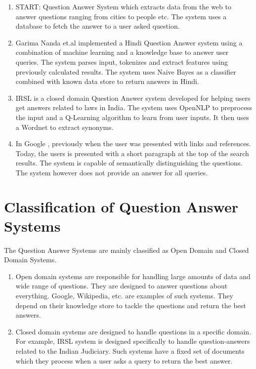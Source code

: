 \begin{enumerate}
\item 
START: Question Answer System \cite{katz1997annotating} which extracts data from the web to answer questions ranging from cities to people etc. The system uses a database to fetch the answer to a user asked question.

\item
Garima Nanda et.al implemented a Hindi Question Answer system \cite {nanda2016hindi} using a combination of machine learning and a knowledge base to answer user queries. The system parses input, tokenizes and extract features using previously calculated results. The system uses  Naive Bayes as a classifier combined with known data store to return answers in Hindi.

\item
IRSL \cite {sangeetha2017information} is a closed domain Question Answer system developed for helping users get answers related to laws in India. The system uses OpenNLP to preprocess the input and a Q-Learning algorithm to learn from user inputs. It then uses a Wordnet to extract synonyms.

\item 
In Google \cite {alupului2016question}, previously when the user was presented with links and references. Today, the users is presented with a short paragraph at the top of the search results. The system is capable of semantically distinguishing the questions. The system however does not provide an answer for all queries.

\end{enumerate}

\section{Classification of Question Answer Systems}
\paragraph{}
The Question Answer Systems are mainly classified as Open Domain and Closed Domain Systems. 

\begin{enumerate}
\item 
Open domain systems are responsible for handling large amounts of data and wide range of questions. They are designed to answer questions about everything. Google, Wikipedia, etc. are examples of such systems. They depend on their knowledge store to tackle the questions and return the best answers.

\item
Closed domain systems are designed to handle questions in a specific domain. For example, IRSL system is designed specifically to handle question-answers related to the Indian Judiciary. Such systems have a fixed set of documents which they process when a user asks a query to return the best answer.

\end{enumerate}

